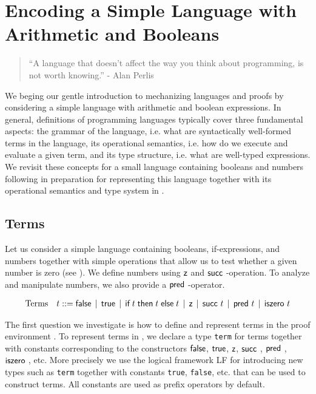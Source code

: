 

\chapter{Encoding a Simple Language with Arithmetic and Booleans}
\label{chap:basic}
\begin{quote}
``A language that doesn't affect the way you think about programming, is
not worth knowing.''
\hfill - Alan Perlis
\end{quote}

We beging our gentle introduction to mechanizing languages and proofs by
considering a simple language with arithmetic and boolean
expressions. In general, definitions of programming languages
typically cover three fundamental aspects: 
the grammar  of the language,  i.e. what are syntactically  well-formed terms in
the language,  its operational semantics,  i.e. how do we execute and evaluate a
given term,  and its  type structure, i.e. what are  well-typed expressions.  We
revisit  these concepts  for  a small language  containing booleans  and numbers
following \citep[Ch 3,Ch 8]{TAPL} in  preparation for representing this language
together with its operational semantics and type system in \beluga.

\section{Terms}\label{sec:terms-basic}
Let  us  consider  a simple language  containing booleans,  if-expressions,  and
numbers together  with simple operations  that allow us  to test whether a given
number is zero (see \cite[Ch 3, Fig 3-1,Fig 3-2]{TAPL}). We define numbers using
$\textsf{z}$ and $\tmsucc$-operation.  To analyze  and manipulate numbers,  we also
provide a $\tmpred$-operator.

\[
\begin{array}{ll@{\bnfas}l}
\mbox{Terms} & t & \tmfalse \bnfalt \tmtrue \bnfalt \tmif t t t \bnfalt
\tmzero \bnfalt \tmsucc t \bnfalt \tmpred t \bnfalt \tmiszero t
\end{array}
\]

The first question  we investigate is  how to define  and represent terms in the
proof  environment  \beluga. To represent  terms  in \beluga,  we declare  a type
\lstinline!term!  for  terms   together  with  constants  corresponding  to  the
constructors    $\textsf{false}$,   $\textsf{true}$,    $\textsf{z}$,   $\tmsucc$,   $\tmpred$,
$\tmiszero$,  etc.   More   precisely   we   use   the   logical   framework  LF
\citep{Harper93jacm} for introducing new types such as \lstinline!term! together
with constants  \lstinline!true!,  \lstinline!false!, etc.  that  can be used to
construct terms. All constants are used as prefix operators by default.

